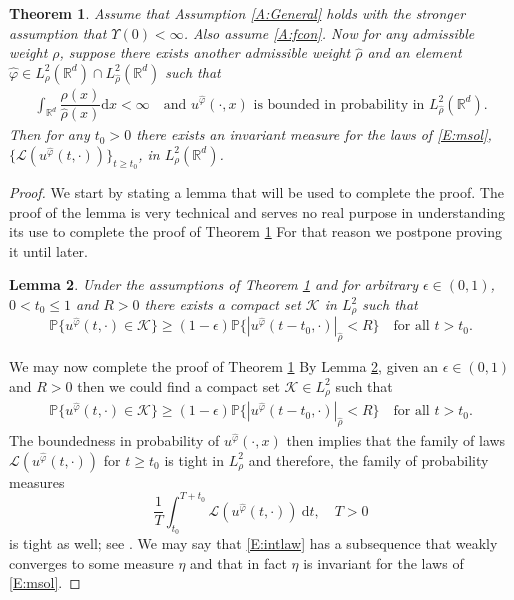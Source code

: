 \documentclass[a4paper,11pt]{article}
\numberwithin{equation}{section}
\theoremstyle{plain}
\newtheorem{theorem}{Theorem}[section]
\newtheorem{lemma}[theorem]{Lemma}
\theoremstyle{definition}
\newcommand{\R}{\mathbb{R}}
\newcommand{\ud}{\ensuremath{\mathrm{d}}}
\begin{document}
\begin{theorem}  
	\label{T:Main}
	Assume that Assumption \ref{A:General} holds with the stronger assumption that $\Upsilon(0) <\infty$. Also assume \eqref{A:fcon}. Now for any admissible weight $\rho$, suppose there exists another admissible weight $\hat\rho$ and an element $\hat{\varphi} \in L^2_\rho(\R^d) \cap L^2_{\hat\rho}(\R^d)$ such that 
	\begin{align*}
		\int_{\R^d}\dfrac{\rho(x)}{\hat\rho(x)}\ud x < \infty \quad \text{and $u^{\hat\varphi}(\cdot,x)$ is bounded in probability in $L^2_{\hat\rho}(\R^d)$.}  
	\end{align*}
	Then for any $t_0 >0$ there exists an invariant measure for the laws of \eqref{E:msol}, $\{\mathscr L (u^{\hat\varphi}(t,\cdot))\}_{t \ge t_0}$,  in $L^2_\rho(\R^d)$.
\end{theorem}

\begin{proof} 
	We start by stating a lemma that will be used to complete the proof. 
	The proof of the lemma is very technical and serves no real purpose in understanding its use to complete 
	the proof of Theorem \ref{T:Main} For that reason we postpone proving it until later. 
 
\begin{lemma}
	\label{L:Main}
Under the assumptions of Theorem \ref{T:Main} and for arbitrary $\epsilon \in (0,1)$, $0< t_0 \le 1$ and $R>0$ there exists a compact set $\mathscr K$ in $L^2_{ \rho}$ such that
 \begin{equation}
	 \label{E:cpt}
	\mathbb{P}\{u^{\hat{\varphi}}(t,\cdot) \in \mathscr K \} \ge (1-\epsilon)\mathbb{P}\{|u^{
	\hat{\varphi}}(t-t_0,\cdot)|_{\hat \rho} < R\} \quad \text{for all $t>t_0$}.
 \end{equation}
\end{lemma}
 
 We may now complete the proof of Theorem \ref{T:Main} By Lemma \ref{L:Main}, given an $\epsilon \in (0,1)$ and $R>0$ then we could find a compact set $\mathscr K \in L^2_{\rho}$ such that  
 \begin{align*}
	 \mathbb{P}\{u^{\hat \varphi}(t,\cdot) \in \mathscr K \} \ge (1-\epsilon)\mathbb{P}\{|u^{\hat \varphi}(t-t_0,\cdot)|_{\hat \rho} < R\} \quad \text{for all $t>t_0$} .
 \end{align*}
The boundedness in probability of $u^{\hat \varphi}(\cdot,x)$ then implies that the family of laws 
$\mathscr L(u^{\hat \varphi}(t,\cdot))$ for $t \ge t_0$ is tight in $L^2_{\rho}$ and therefore,
the family of probability measures 
 \begin{equation}
	 \label{E:intlaw}
	 \dfrac{1}{T}\int_{t_0}^{T+t_0} \mathscr L(u^{\hat \varphi}(t,\cdot))\: \ud t, \quad T>0 
 \end{equation}
 is tight as well; see \cite[Corollary 3.1.2]{DZ96}. 
 We may say that \eqref{E:intlaw} has a subsequence that weakly converges to some measure $\eta$ and that in fact $\eta$
 is invariant for the laws of \eqref{E:msol}. 
 \end{proof}
 
\end{document}
